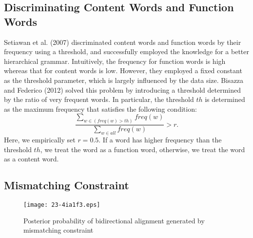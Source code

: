 \documentclass[english]{jnlp_1.4}
\begin{document}
\subsection{Discriminating Content Words and Function Words}
\label{subsec:discriminating}

Setiawan et al. (2007) discriminated content words and function words by their frequency using a threshold, and successfully employed the knowledge for a better hierarchical grammar.
Intuitively, the frequency for function words is high whereas that for content words is low.
However, they employed a fixed constant as the threshold parameter, which is largely influenced by the data size.
Bisazza and Federico (2012) solved this problem by introducing a threshold determined by the ratio of very frequent words.
In particular, the threshold $th$ is determined as the maximum frequency that satisfies the following condition:
\begin{equation}
\label{eqn:w}
\frac{\sum_{w \in (\mathit{freq}(w) > th)}{\mathit{freq}(w)}}{\sum_{w \in all}{\mathit{freq}(w)}} > r.
\end{equation}
Here, we empirically set $r = 0.5$.
If a word has higher frequency than the threshold $th$, we treat the word as a function word, otherwise, we treat the word as a content word.


\subsection{Mismatching Constraint}
\label{subsec:mismatch}

\begin{figure}[b]
\begin{center}
\texttt{[image: 23-4ia1f3.eps]}
\end{center}
  \caption{Posterior probability of bidirectional alignment generated by mismatching constraint}
  \label{fig:ex2}
\end{figure}
\end{document}
